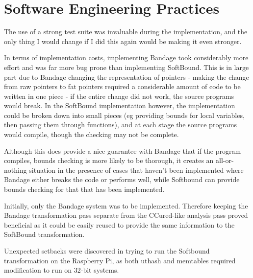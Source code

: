 \documentclass[a4paper,12pt,twoside,openright]{report}
\begin{document}
\section{Software Engineering Practices}

The use of a strong test suite was invaluable during the implementation, and the only thing I would change if I did this again would be making it even stronger.

In terms of implementation costs, implementing Bandage took considerably more effort and was far more bug prone than implementing SoftBound.
This is in large part due to Bandage changing the representation of pointers - making the change from raw pointers to fat pointers required a considerable amount of code to be written in one piece - if the entire change did not work, the source programs would break.
In the SoftBound implementation however, the implementation could be broken down into small pieces (eg providing bounds for local variables, then passing them through functions), and at each stage the source programs would compile, though the checking may not be complete.

Although this does provide a nice guarantee with Bandage that if the program compiles, bounds checking is more likely to be thorough, it creates an all-or-nothing situation in the presence of cases that haven't been implemented where Bandage either breaks the code or performs well, while Softbound can provide bounds checking for that that has been implemented.

Initially, only the Bandage system was to be implemented.
Therefore keeping the Bandage transformation pass separate from the CCured-like analysis pass proved beneficial as it could be easily reused to provide the same information to the SoftBound transformation.

Unexpected setbacks were discovered in trying to run the Softbound transformation on the Raspberry Pi, as both uthash and memtables required modification to run on 32-bit systems.

\appendix
\singlespacing

 
 
\end{document}
